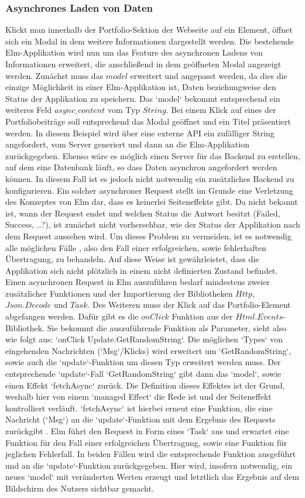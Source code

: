 \subsubsection{Asynchrones Laden von Daten}
\label{sec:async-laden}
Klickt man innerhalb der Portfolio-Sektion der Webseite auf ein Element, öffnet sich ein Modal in dem weitere Informationen dargestellt werden. Die bestehende Elm-Applikation wird nun um das Feature des asynchronen Ladens von Informationen erweitert, die anschließend in dem geöffneten Modal angezeigt werden.
Zunächst muss das $model$ erweitert und angepasst werden, da dies die einzige Möglichkeit in einer Elm-Applikation ist, Daten beziehungweise den Status der Applikation zu speichern. Das `model` bekommt entsprechend ein weiteres Feld $async\_content$ vom Typ $String$.
Bei einem Klick auf eines der Portfoliobeiträge soll entsprechend das Modal geöffnet und ein Titel präsentiert werden. In diesem Beispiel wird über eine externe API ein zufälliger String angefordert, vom Server generiert und dann an die Elm-Applikation zurückgegeben. Ebenso wäre es möglich einen Server für das Backend zu erstellen, auf dem eine Datenbank läuft, so dass Daten asynchron angefordert werden können. In diesem Fall ist es jedoch nicht notwendig ein zusätzliches Backend zu konfigurieren.
Ein solcher asynchroner Request stellt im Grunde eine Verletzung des Konzeptes von Elm dar, dass es keinerlei Seiteneffekte gibt. Da nicht bekannt ist, wann der Request endet und welchen Status die Antwort besitzt (Failed, Success, ..?), ist zunächst nicht vorhersehbar, wie der Status der Applikation nach dem Request aussehen wird. Um dieses Problem zu vermeiden, ist es notwendig alle möglichen Fälle , also den Fall einer erfolgreichen, sowie fehlerhaften Übertragung, zu behandeln. Auf diese Weise ist gewährleistet, dass die Applikation sich nicht plötzlich in einem nicht definierten Zustand befindet.
Einen asynchronen Request in Elm auszuführen bedarf mindestens zweier zusätzlicher Funktionen und der Importierung der Bibliotheken $Http$, $Json.Decode$ und $Task$. Des Weiteren muss der Klick auf das Portfolio-Element abgefangen werden. Dafür gibt es die $onClick$ Funktion aus der $Html.Events$-Bibliothek. Sie bekommt die auszuführende Funktion als Parameter, sieht also wie folgt aus: `onClick Update.GetRandomString`. Die möglichen `Types` von eingehenden Nachrichten (`Msg`/Klicks) wird erweitert um `GetRandomString`, sowie auch die `update`-Funktion um diesen Typ erweitert werden muss. Der entsprechende `update`-Fall `GetRandomString` gibt dann das `model`, sowie einen Effekt `fetchAsync` zurück. Die Definition dieses Effektes ist der Grund, weshalb hier von einem `managed Effect` die Rede ist und der Seiteneffekt kontrolliert verläuft. `fetchAsync` ist hierbei erneut eine Funktion, die eine Nachricht (`Msg`) an die `update`-Funktion mit dem Ergebnis des Requests zurückgibt . Elm führt den Request in Form eines `Task` aus und erwartet eine Funktion für den Fall einer erfolgreichen Übertragung, sowie eine Funktion für jeglichen Fehlerfall. In beiden Fällen wird die entsprechende Funktion ausgeführt und an die `update`-Funktion zurückgegeben. Hier wird, insofern notwendig, ein neues `model` mit veränderten Werten erzeugt und letztlich das Ergebnis auf dem Bildschirm des Nutzers sichtbar gemacht.\\
